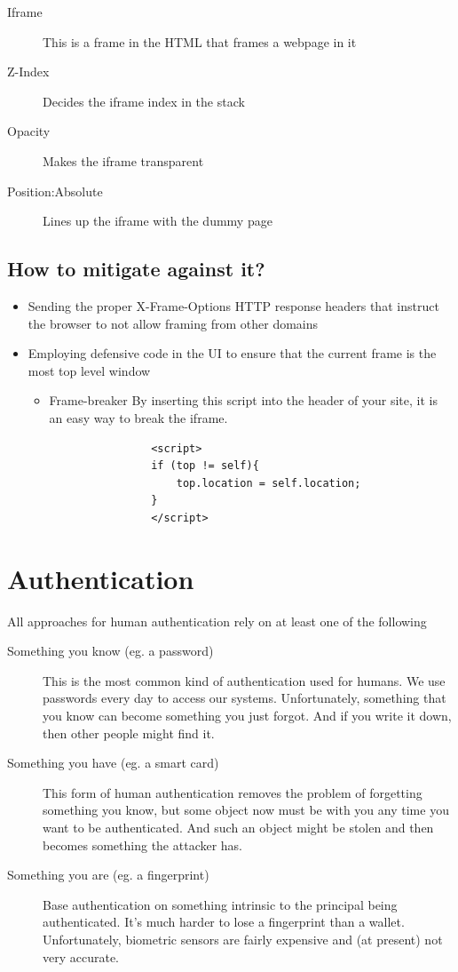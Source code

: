 \documentclass[a4paper, titlepage]{article}
\begin{document}
\begin{description}
    \item[Iframe] This is a frame in the HTML that frames a webpage in it
    \item[Z-Index] Decides the iframe index in the stack
    \item[Opacity] Makes the iframe transparent
    \item[Position:Absolute] Lines up the iframe with the dummy page
\end{description}

\subsection{How to mitigate against it?}

\begin{itemize}
    \item Sending the proper X-Frame-Options HTTP response headers that instruct the browser to not allow framing from other domains
    \item Employing defensive code in the UI to ensure that the current frame is the most top level window
        \begin{itemize}
            \item Frame-breaker
                By inserting this script into the header of your site, it is an easy way to break the iframe.

                \begin{lstlisting}
                <script>
                if (top != self){
                    top.location = self.location;
                }
                </script>
                \end{lstlisting}
        \end{itemize}
\end{itemize}
\newpage

\section{Authentication}
All approaches for human authentication rely on at least one of the following
\begin{description}
    \item[Something you know (eg. a password)] This is the most common kind of authentication used for humans. We use passwords every day to access our systems. Unfortunately, something that you know can become something you just forgot. And if you write it down, then other people might find it.
    \item [Something you have (eg. a smart card)] This form of human authentication removes the problem of forgetting something you know, but some object now must be with you any time you want to be authenticated. And such an object might be stolen and then becomes something the attacker has.
    \item [Something you are (eg. a fingerprint)] Base authentication on something intrinsic to the principal being authenticated. It's much harder to lose a fingerprint than a wallet. Unfortunately, biometric sensors are fairly expensive and (at present) not very accurate.
\end{description}
\end{document}
